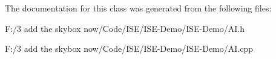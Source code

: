 The documentation for this class was generated from the following files\-:\begin{DoxyCompactItemize}
\item 
F\-:/3 add the skybox now/\-Code/\-I\-S\-E/\-I\-S\-E-\/\-Demo/\-I\-S\-E-\/\-Demo/A\-I.\-h\item 
F\-:/3 add the skybox now/\-Code/\-I\-S\-E/\-I\-S\-E-\/\-Demo/\-I\-S\-E-\/\-Demo/A\-I.\-cpp\end{DoxyCompactItemize}
